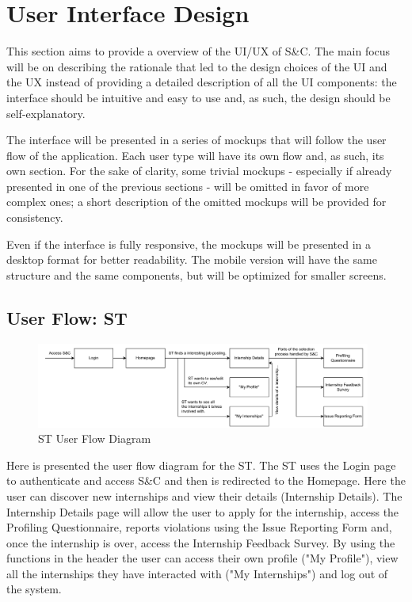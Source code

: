 \chapter{User Interface Design}
\label{chap:user-interface-design}%

\par This section aims to provide a overview of the UI/UX of S\&C. The main focus will be on describing the rationale
that led to the design choices of the UI and the UX instead of providing a detailed description of all the UI
components: the interface should be intuitive and easy to use and, as such, the design should be self-explanatory.

\par The interface will be presented in a series of mockups that will follow the user flow of the application. Each
user type will have its own flow and, as such, its own section. For the sake of clarity, some trivial mockups -
especially if already presented in one of the previous sections - will be omitted in favor of more complex ones; a
short description of the omitted mockups will be provided for consistency.

\par Even if the interface is fully responsive, the mockups will be presented in a desktop format for better
readability. The mobile version will have the same structure and the same components, but will be optimized for
smaller screens.

\section{User Flow: ST}
\label{sec:user-flow-st}%

\begin{figure}[H]
    \centering
    \includegraphics[width=0.98\textwidth]{Images/GUI/ST/Diagram.pdf}
    \caption{ST User Flow Diagram}
    \label{fig:st-user-flow-diagram}
\end{figure}

\par Here is presented the user flow diagram for the ST. The ST uses the Login page to authenticate and access S\&C
and then is redirected to the Homepage. Here the user can discover new internships and view their details
(Internship Details). The Internship Details page will allow the user to apply for the internship, access the
Profiling Questionnaire, reports violations using the Issue Reporting Form and, once the internship is over,
access the Internship Feedback Survey. By using the functions in the header the user can access their own profile
("My Profile"), view all the internships they have interacted with ("My Internships") and log out of the system.

